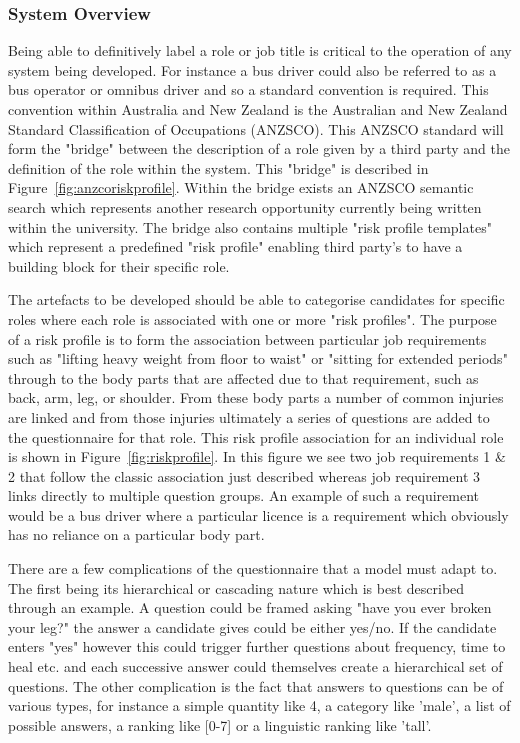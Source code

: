 \subsubsection{System Overview}

Being able to definitively label a role or job title is critical to the operation of any system being developed.
For instance a bus driver could also be referred to as a bus operator or omnibus driver and so a standard convention
is required. This convention within Australia and New Zealand is the Australian and New Zealand Standard Classification
of Occupations (ANZSCO). This ANZSCO standard will form the "bridge" between the description of a role given by
a third party and the definition of the role within the system. This "bridge" is described in Figure~\ref{fig:anzcoriskprofile}.
Within the bridge exists an ANZSCO semantic search which represents another research opportunity currently being written
within the university. The bridge also contains multiple "risk profile templates" which represent a predefined "risk profile"
enabling third party's to have a building block for their specific role.



The artefacts to be developed should be able to categorise candidates for specific roles where each role is
associated with one or more "risk profiles". The purpose of a risk profile is to form the association between
particular job requirements such as "lifting heavy weight from floor to waist" or "sitting for extended periods"
through to the body parts that are affected
due to that requirement, such as back, arm, leg, or shoulder. From these body parts a number of common injuries are linked and from those injuries
ultimately a series of questions are added to the questionnaire for that role. This risk profile association
for an individual role is shown in Figure~\ref{fig:riskprofile}. In this figure we see two job requirements 1 \& 2
that follow the classic association just described whereas job requirement 3 links directly to multiple question groups.
An example of such a requirement would be a bus driver where a particular licence is a requirement which obviously has
no reliance on a particular body part.




There are a few complications of the questionnaire that a model must adapt to. The first being its hierarchical or cascading
nature which is best described through an example.
A question could be framed asking "have you ever broken your leg?" the answer a candidate gives could be either yes/no.
If the candidate enters "yes" however this could trigger further questions about frequency, time to heal etc. and each
successive answer could themselves create a hierarchical set of questions. The other complication is the fact that answers
to questions can be of various types, for instance a simple quantity like 4, a category like 'male', a list of possible
answers, a ranking like [0-7] or a linguistic ranking like 'tall'.

